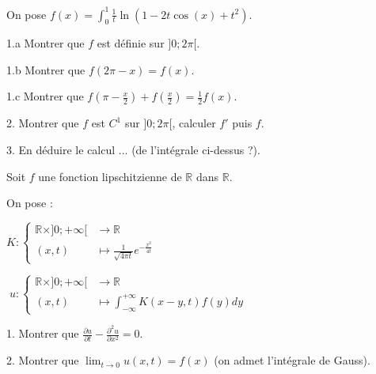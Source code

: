 \noindent On pose $\displaystyle f(x) = \int_{0}^{1} \frac {1} {t} \ln(1 - 2 t \cos(x) + t^2)$.

\vspace{5pt}
1.a Montrer que $f$ est définie sur $\rbrack 0; 2 \pi \lbrack$.

\vspace{5pt}
1.b Montrer que $f(2 \pi - x) = f(x)$.

\vspace{5pt}
1.c Montrer que $\displaystyle f\left(\pi - \frac {x} {2}\right) + f\left(\frac {x} {2}\right) = \frac {1} {2} f(x)$.

\vspace{5pt}
2. Montrer que $f$ est $C^1$ sur $\rbrack 0; 2 \pi \lbrack$, calculer $f'$ puis $f$.

\vspace{5pt}
3. En déduire le calcul ... (de l'intégrale ci-dessus ?).



\subetoiles



\noindent Soit $f$ une fonction lipschitzienne de $\mathbb{R}$ dans $\mathbb{R}$.

\vspace{5pt}
\noindent On pose :

$\displaystyle K :
\begin{cases}
  \mathbb{R} \times \rbrack 0; +\infty \lbrack & \longrightarrow \mathbb{R}\\    
  (x,t) & \longmapsto \displaystyle \frac {1} {\sqrt{4 \pi t}} e^{-\frac {x^2} {4t}}
\end{cases}
$

$\;u :
\begin{cases}
  \mathbb{R} \times \rbrack 0; +\infty \lbrack & \longrightarrow \mathbb{R}\\    
  (x,t) & \longmapsto \displaystyle \int_{-\infty}^{+\infty} {K(x-y, t)f(y)dy}
\end{cases}
$

\vspace{5pt}
1. Montrer que $\displaystyle \frac {\partial u} {\partial t} - \frac {\partial^2 u} {\partial x^2} = 0$.

\vspace{5pt}
2. Montrer que $\displaystyle \lim_{t \to 0} u(x, t) = f(x)$ (on admet l'intégrale de Gauss).



\subetoiles
\columnbreak



